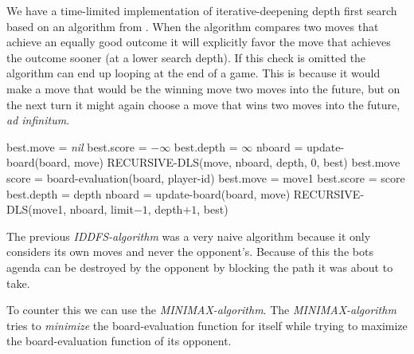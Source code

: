 \documentclass[a4paper,11pt]{article}
\begin{document}
We have a time-limited implementation of iterative-deepening depth
first search based on an algorithm from \cite{aimodern}. When the
algorithm compares two moves that achieve an equally good outcome it
will explicitly favor the move that achieves the outcome sooner (at a
lower search depth). If this check is omitted the algorithm can end up
looping at the end of a game. This is because it would make a move
that would be the winning move two moves into the future, but on the
next turn it might again choose a move that wins two moves into the
future, \emph{ad infinitum}.

\begin{algorithmic}
\State best.move = \emph{nil}
\State best.score = $-\infty$
\State best.depth = $\infty$
  \State nboard = update-board(board, move)
  \State RECURSIVE-DLS(move, nboard, depth, 0, best)
 \EndFor
  \State \Return best.move
 \EndIf
\EndFor
\EndFunction
\\
\State score = board-evaluation(board, player-id)
\State best.move = move1
\State best.score = score
\State best.depth = depth
\EndIf
{}
\State \Return
\EndIf
{}
 \State nboard = update-board(board, move)
 \State RECURSIVE-DLS(move1, nboard, limit$-1$, depth$+1$, best)
\EndFor
\EndFunction
\end{algorithmic}

The previous \emph{IDDFS-algorithm} was a very naive algorithm because it only
considers its own moves and never the opponent's. Because of this the bots
agenda can be destroyed by the opponent by blocking the path it was about
to take.

To counter this we can use the \emph{MINIMAX-algorithm}. The
\emph{MINIMAX-algorithm} tries to \emph{minimize} the board-evaluation function
for itself while trying to maximize the board-evaluation function of its
opponent.
\end{document}
